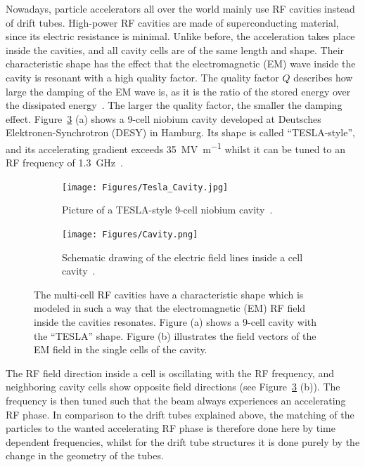 Nowadays, particle accelerators all over the world mainly use RF cavities instead of drift tubes.
High-power RF cavities are made of superconducting material, since its electric resistance is minimal.
Unlike before, the acceleration takes place inside the cavities, and all cavity cells are of the same length and shape.
Their characteristic shape has the effect that the electromagnetic (EM) wave inside the cavity is resonant with a high quality factor.
The quality factor $Q$ describes how large the damping of the EM wave is, as it is the ratio of the stored energy over the dissipated energy~\cite[p. 148]{Wilson}.
The larger the quality factor, the smaller the damping effect.
Figure~\ref{fig:Cavities} (a) shows a 9-cell niobium cavity developed at Deutsches Elektronen-Synchrotron (DESY) in Hamburg.
Its shape is called ``TESLA-style'', and its accelerating gradient exceeds \SI{35}{\mega\volt\per\meter} whilst it can be tuned to an RF frequency of \SI{1.3}{\giga\hertz}~\cite[p. 15f]{TDR31}.
\begin{figure}
\begin{subfigure}[b]{0.49\textwidth}
\centering
 \texttt{[image: Figures/Tesla\_Cavity.jpg]}
\caption[Tesla-style 9-cell cavity]{Picture of a TESLA-style 9-cell niobium cavity~\cite[p. 15]{TDR31}.}
\label{fig:Tesla_Cavity}
\end{subfigure}\hfill
\begin{subfigure}[b]{0.49\textwidth}
\centering
 \texttt{[image: Figures/Cavity.png]}
\caption[Electric field in a cell cavity]{Schematic drawing of the electric field lines inside a cell cavity~\cite[p. 47]{Desy_SummerStudent_Lecture}.}
\label{fig:Cavity}
\end{subfigure}
\caption[RF cavities]{The multi-cell RF cavities have a characteristic shape which is modeled in such a way that the electromagnetic (EM) RF field inside the cavities resonates. Figure (a) shows a 9-cell cavity with the ``TESLA'' shape. Figure (b) illustrates the field vectors of the EM field in the single cells of the cavity.}
\label{fig:Cavities}
\end{figure}
The RF field direction inside a cell is oscillating with the RF frequency, and neighboring cavity cells show opposite field directions (see Figure~\ref{fig:Cavities} (b)).
The frequency is then tuned such that the beam always experiences an accelerating RF phase.
In comparison to the drift tubes explained above, the matching of the particles to the wanted accelerating RF phase is therefore done here by time dependent frequencies, whilst for the drift tube structures it is done purely by the change in the geometry of the tubes.


